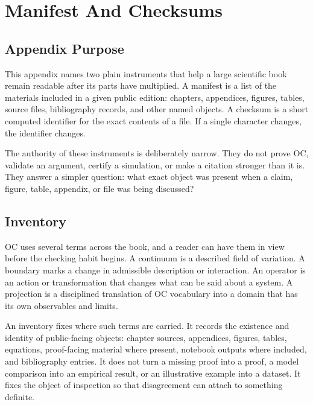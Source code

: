 \documentclass[11pt,a4paper,openany]{book}
\begin{document}
\section{Manifest And Checksums}
\subsection{Appendix Purpose}
This appendix names two plain instruments that help a large scientific book remain readable after its parts have multiplied. A manifest is a list of the materials included in a given public edition: chapters, appendices, figures, tables, source files, bibliography records, and other named objects. A checksum is a short computed identifier for the exact contents of a file. If a single character changes, the identifier changes. \cite{kadanoff_scaling,wilson_renormalization}\par
The authority of these instruments is deliberately narrow. They do not prove OC, validate an argument, certify a simulation, or make a citation stronger than it is. They answer a simpler question: what exact object was present when a claim, figure, table, appendix, or file was being discussed?\par
\subsection{Inventory}
OC uses several terms across the book, and a reader can have them in view before the checking habit begins. A continuum is a described field of variation. A boundary marks a change in admissible description or interaction. An operator is an action or transformation that changes what can be said about a system. A projection is a disciplined translation of OC vocabulary into a domain that has its own observables and limits. \cite{kadanoff_scaling,wilson_renormalization}\par
An inventory fixes where such terms are carried. It records the existence and identity of public-facing objects: chapter sources, appendices, figures, tables, equations, proof-facing material where present, notebook outputs where included, and bibliography entries. It does not turn a missing proof into a proof, a model comparison into an empirical result, or an illustrative example into a dataset. It fixes the object of inspection so that disagreement can attach to something definite.\par
\end{document}
